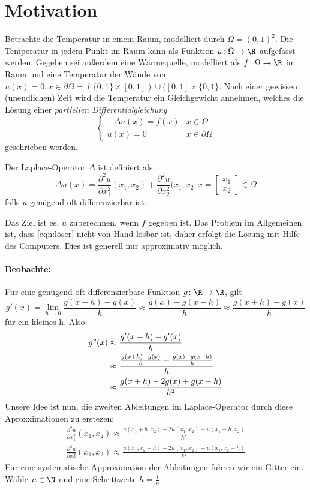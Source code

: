 \section*{Motivation}
Betrachte die Temperatur in einem Raum, modelliert durch $\Omega = (0,1)^2$.
Die Temperatur in jedem Punkt im Raum kann als Funktion $u \colon \Omega \to \R $ aufgefasst werden.
Gegeben sei außerdem eine Wärmequelle, modelliert als $f \colon \Omega \to \R $  im Raum und eine Temperatur der Wände von $u(x)=0, x \in \partial \Omega = (\{0,1\} \times [0,1] ) \cup ([0,1] \times \{0,1\} $.
Nach einer gewissen (unendlichen) Zeit wird die Temperatur ein Gleichgewicht annehmen, welches die Lösung einer \emph{partiellen Differentialgleichung}
\begin{equation}
	\label{eqn:löser}
\begin{cases}
	-\Delta u(x) = f(x) & x \in \Omega \\
	u(x) = 0 & x \in \partial \Omega
\end{cases}
\end{equation}
geschrieben werden.
\begin{definition}
Der Laplace-Operator $\Delta$ ist definiert als: 
\[
\Delta u(x) = \frac{\partial^2 u}{\partial x_1^2}(x_1,x_2) + \frac{\partial^2 u}{\partial x_2^2}(x_1,x_2 , x = \begin{bmatrix}
x_1 \\ x_{2} 
\end{bmatrix} \in \Omega
\]
falls $u$ genügend oft differenzierbar ist.
\end{definition}
Das Ziel ist es, $u$ zuberechnen, wenn $f$ gegeben ist. Das Problem im Allgemeinen ist, dass \eqref{eqn:löser} nicht von Hand lösbar ist, daher erfolgt die Lösung mit Hilfe des Computers. Dies ist generell nur approximativ möglich.
\paragraph{Beobachte:} Für eine genügend oft differenzierbare Funktion $g \colon \R \to \R $, gilt 
\[
g'(x)= \lim_{h \to 0} \frac{g(x+h)-g(x)}{h} \approx \frac{g(x)-g(x-h)}{h} \approx \frac{g(x+h)-g(x)}{h}
\]
für ein kleines h. Also:
\begin{align*}
	g"(x) &\approx \frac{g'(x+h)-g'(x)}{h} \\
	      &\approx \frac{\frac{g(x+h)-g(x)}{h}-\frac{g(x)-g(x-h)}{h}}{h} \\
	      &\approx \frac{g(x+h)-2g(x)+g(x-h)}{h^2}
\end{align*}
Unsere Idee ist nun, die zweiten Ableitungen im Laplace-Operator durch diese Aproxximationen zu erstezen:
\begin{align*}
\frac{\partial^2 u}{\partial x_{1}^2}(x_1,x_2) \approx \frac{u(x_1+h,x_2) - 2u(x_1,x_2) + u(x_1-h,x_2)}{h^2} \\
\frac{\partial^2 u}{\partial x_{2}^2}(x_1,x_2) \approx \frac{u(x_1,x_2+h) - 2u(x_1,x_2) + u(x_1,x_2-h)}{h^2}
\end{align*}
Für eine systematische Approximation der Ableitungen führen wir ein Gitter ein. Wähle $n \in \N$ und eine Schrittweite $h=\frac{1}{n}$.

